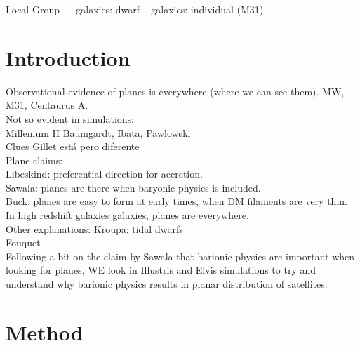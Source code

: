 \documentclass[useAMS,usenatbib]{mn2e}
\begin{document}
\pagerange{\pageref{firstpage}--\pageref{lastpage}} 

\maketitle

\label{firstpage}

\begin{abstract}

\end{abstract}

\begin{keywords}
Local Group --- galaxies: dwarf -- galaxies: individual (M31)  
\end{keywords}

\section{Introduction}

Observational evidence of planes is everywhere (where we can see them). MW, M31, Centaurus A.\\

Not so evident in simulations:\\

Millenium II Baumgardt, Ibata, Pawlowski\\

Clues Gillet está pero diferente\\

Plane claims:\\
Libeskind: preferential direction for accretion.\\
Sawala: planes are there when baryonic physics is included.\\
Buck: planes are easy to form at early times, when DM filaments are very thin. In high redshift galaxies galaxies, planes are everywhere.\\

Other explanations: Kroupa: tidal dwarfs\\
Fouquet\\



 
Following a bit on the claim by Sawala that barionic physics are important when looking for planes, WE look in Illustris and Elvis simulations to try and understand why barionic physics results in planar distribution of satellites.


\section{Method}
\label{Method}
\end{document}
